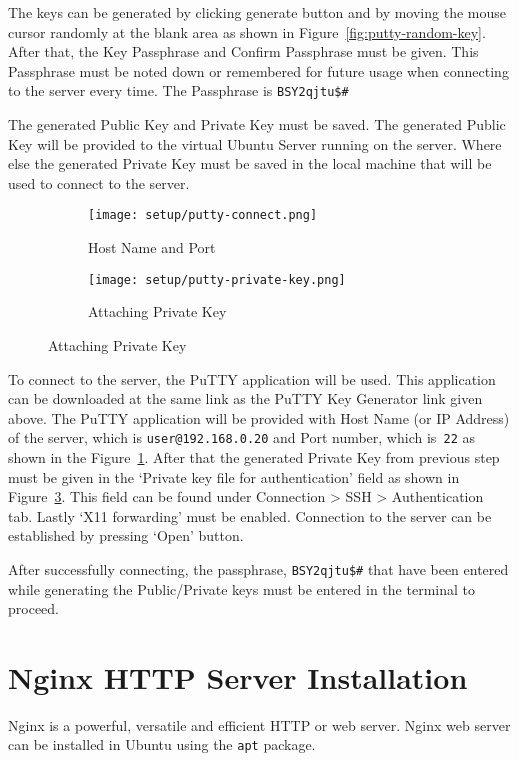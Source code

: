 The keys can be generated by clicking generate button and by moving the mouse cursor randomly at the blank area as shown in Figure~\ref{fig:putty-random-key}. After that, the Key Passphrase and Confirm Passphrase must be given. This Passphrase must be noted down or remembered for future usage when connecting to the server every time. The Passphrase is \texttt{BSY2qjtu\$\#}

The generated Public Key and Private Key must be saved. The generated Public Key will be provided to the virtual Ubuntu Server running on the server. Where else the generated Private Key must be saved in the local machine that will be used to connect to the server.

\begin{figure}[h]
\centering
	\begin{subfigure}{.49\linewidth}
	\caption{Host Name and Port}
	\label{fig:putty-connect}
	\centering
	\texttt{[image: setup/putty-connect.png]}
	\end{subfigure}
	\begin{subfigure}{.49\linewidth}
	\caption{Attaching Private Key}
	\label{fig:putty-private-key}
	\centering
	\texttt{[image: setup/putty-private-key.png]}
	\end{subfigure}
\end{figure}

To connect to the server, the PuTTY application will be used. This application can be downloaded at the same link as the PuTTY Key Generator link given above. The PuTTY application will be provided with Host Name (or IP Address) of the server, which is \texttt{user@192.168.0.20} and Port number, which is\texttt{ 22} as shown in the Figure~\ref{fig:putty-connect}. After that the generated Private Key from previous step must be given in the ‘Private key file for authentication’ field as shown in Figure~\ref{fig:putty-private-key}. This field can be found under Connection > SSH > Authentication tab. Lastly ‘X11 forwarding’ must be enabled. Connection to the server can be established by pressing ‘Open’ button.

After successfully connecting, the passphrase, \texttt{BSY2qjtu\$\#} that have been entered while generating the Public/Private keys must be entered in the terminal to proceed.

\section{Nginx HTTP Server Installation} \label{sec:nginx-http-server-installation}
Nginx is a powerful, versatile and efficient HTTP or web server. Nginx web server can be installed in Ubuntu using the \texttt{apt} package.

